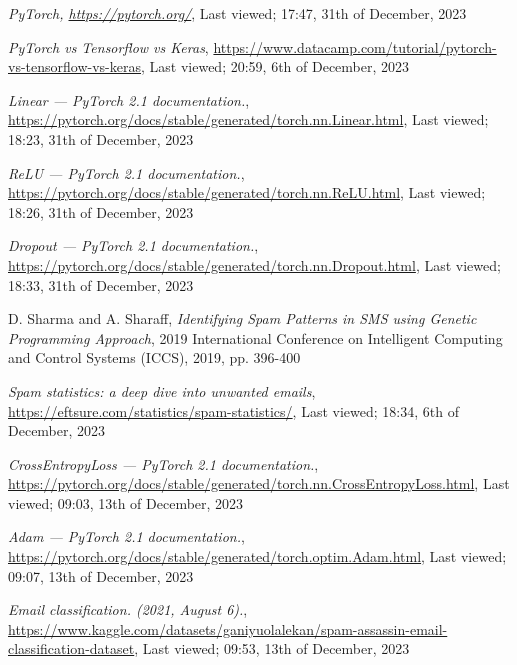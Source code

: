 \documentclass[lettersize,journal]{IEEEtran}
\begin{document}
\begin{thebibliography}{1}

{\it{PyTorch}, \href{https://pytorch.org/}{https://pytorch.org/}}, Last viewed; 17:47, 31th of December, 2023

{\it{PyTorch vs Tensorflow vs Keras}}, \href{https://www.datacamp.com/tutorial/pytorch-vs-tensorflow-vs-keras}{https://www.datacamp.com/tutorial/pytorch-vs-tensorflow-vs-keras}, Last viewed; 20:59, 6th of December, 2023

{\it{Linear — PyTorch 2.1 documentation.}}, \href{https://pytorch.org/docs/stable/generated/torch.nn.Linear.html}{https://pytorch.org/docs/stable/generated/torch.nn.Linear.html}, Last viewed; 18:23, 31th of December, 2023

{\it{ReLU — PyTorch 2.1 documentation.}}, \href{https://pytorch.org/docs/stable/generated/torch.nn.ReLU.html}{https://pytorch.org/docs/stable/generated/torch.nn.ReLU.html}, Last viewed; 18:26, 31th of December, 2023

{\it{Dropout — PyTorch 2.1 documentation.}}, \href{https://pytorch.org/docs/stable/generated/torch.nn.Dropout.html}{https://pytorch.org/docs/stable/generated/torch.nn.Dropout.html}, Last viewed; 18:33, 31th of December, 2023

D. Sharma and A. Sharaff, {\it{Identifying Spam Patterns in SMS using Genetic Programming Approach}}, 2019 International Conference on Intelligent Computing and Control Systems (ICCS), 2019, pp. 396-400

{\it{Spam statistics: a deep dive into unwanted emails}}, \href{https://eftsure.com/statistics/spam-statistics/}{https://eftsure.com/statistics/spam-statistics/}, Last viewed; 18:34, 6th of December, 2023

{\it{CrossEntropyLoss — PyTorch 2.1 documentation.}}, \href{https://pytorch.org/docs/stable/generated/torch.nn.CrossEntropyLoss.html}{https://pytorch.org/docs/stable/generated/torch.nn.CrossEntropyLoss.html}, Last viewed; 09:03, 13th of December, 2023

{\it{Adam — PyTorch 2.1 documentation.}}, \href{https://pytorch.org/docs/stable/generated/torch.optim.Adam.html}{https://pytorch.org/docs/stable/generated/torch.optim.Adam.html}, Last viewed; 09:07, 13th of December, 2023

{\it{Email classification. (2021, August 6).}}, \href{https://www.kaggle.com/datasets/ganiyuolalekan/spam-assassin-email-classification-dataset}{https://www.kaggle.com/datasets/ganiyuolalekan/spam-assassin-email-classification-dataset}, Last viewed; 09:53, 13th of December, 2023


\end{thebibliography}
\end{document}
